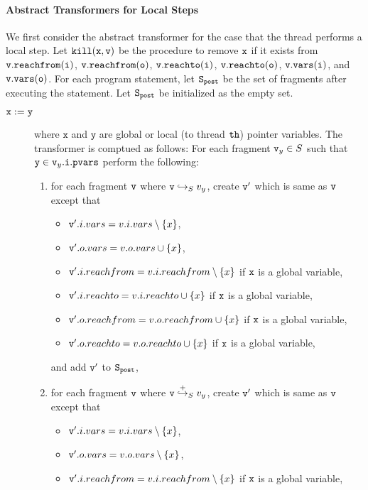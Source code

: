 \paragraph{Abstract Transformers for Local Steps} We first consider
the abstract transformer for the case that the thread performs a local
step.
Let $\tt kill(x,v)$ be the procedure to remove $\tt x$ if it exists from $\tt v.{\tt reachfrom}(\tt i)$, $\tt v.{\tt reachfrom}(\tt o)$, $\tt v.{\tt reachto}(\tt i)$, $\tt v.{\tt reachto}(\tt o)$, $\tt v.{\tt vars}(\tt i)$, and $\tt v.{\tt vars}(\tt o)$. For each program statement, let $\tt S_{post}$ be the set of fragments after executing the statement. Let $\tt S_{post}$ be initialized as the empty set.
\begin{description}
\item[${\tt x := y}$] where $\mathtt{x}$ and $\mathtt{y}$ are global or local
  (to thread ${\tt th}$) pointer variables.
  The transformer is comptued as follows: For each fragment $\mathtt{v}_y \in S$ such that $\mathtt{y} \in \mathtt{v}_y.\mathtt{i}.\mathtt{pvars}$ perform the following:
\begin{enumerate}
\item  for each fragment $\mathtt{v}$ where $\mathtt{v} \hookrightarrow_S v_y$, create $\mathtt{v}'$ which is same as $\mathtt{v}$ except that
\begin{itemize}
\item $\mathtt{v}'.i.vars = v.i.vars \setminus \{x\}$,
\item $\mathtt{v}'.o.vars = v.o.vars \cup \{x\}$,
\item $\mathtt{v}'.i.reachfrom = v.i.reachfrom \setminus \{x\}$ if $\tt x$ is a global variable,
\item $\mathtt{v}'.i.reachto = v.i.reachto \cup \{x\}$ if $\tt x$ is a global variable,
 \item $\mathtt{v}'.o.reachfrom = v.o.reachfrom \cup \{x\}$ if $\tt x$ is a global variable,
\item $\mathtt{v}'.o.reachto = v.o.reachto \cup \{x\}$ if $\tt x$ is a global variable,
\end{itemize}
and add $\mathtt{v}'$ to $\tt S_{post}$,
\item for each fragment $\mathtt{v}$ where $\mathtt{v} \overset{+}\hookrightarrow_S v_y$, create $\mathtt{v}'$ which is same as $\mathtt{v}$ except that
\begin{itemize}
\item $\mathtt{v}'.i.vars = v.i.vars \setminus \{x\}$,
\item $\mathtt{v}'.o.vars = v.o.vars \setminus \{x\}$,
\item $\mathtt{v}'.i.reachfrom = v.i.reachfrom \setminus \{x\}$ if $\tt x$ is a global variable,

\end{itemize}
\end{enumerate}
\end{description}
